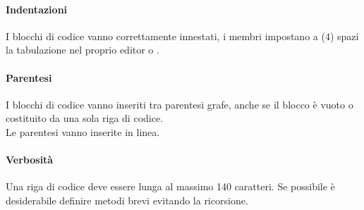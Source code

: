 \paragraph*{Indentazioni}
I blocchi di codice vanno correttamente innestati, i membri impostano a (4) spazi la tabulazione nel proprio editor o .
\paragraph*{Parentesi}
I blocchi di codice vanno inseriti tra parentesi grafe, anche se il blocco è vuoto o costituito da una sola riga di codice. \\
Le parentesi vanno inserite in linea.
\paragraph{Verbosità}
Una riga di codice deve essere lunga al massimo 140 caratteri.
Se possibile è desiderabile definire metodi brevi evitando la ricorsione.


